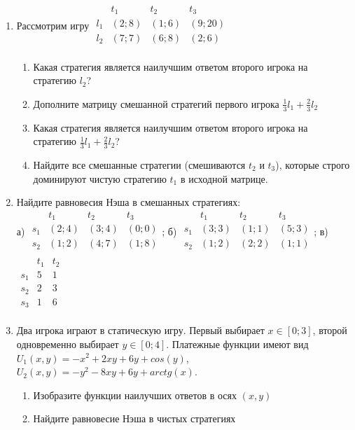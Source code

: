 \documentclass[pdftex,12pt,a4paper]{article}
\begin{document}
\begin{enumerate}

\item Рассмотрим игру $\begin{array}{c|ccc}
    {} &  {t_1 } & {t_2 } & {t_3 }   \\
\hline
    {l_1 } &  {\left( {2;8} \right)} & {\left( {1;6} \right)} & {\left( {9;20} \right)}   \\
    {l_2 } &  {\left( {7;7} \right)} & {\left( {6;8} \right)} & {\left( {2;6} \right)}   \\
\end{array}$
\begin{enumerate}
\item Какая стратегия является наилучшим ответом второго игрока на стратегию $l_2 $?
\item Дополните матрицу смешанной стратегий первого игрока $\frac{1}{3}l_1  + \frac{2}{3}l_2 $
\item Какая стратегия является наилучшим ответом второго игрока на стратегию $\frac{1}{3}l_1  + \frac{2}{3}l_2 $?
\item Найдите все смешанные стратегии (смешиваются $t_2 $  и $t_3 $), которые строго доминируют чистую стратегию $t_1 $ в исходной матрице. 
\end{enumerate}

\item Найдите равновесия Нэша в смешанных стратегиях: \\
а) $\begin{array}{c|ccc}
& t_{1} & t_{2} & t_{3} \\
\hline
s_{1} & (2;4) & (3;4) & (0;0) \\
s_{2} & (1;2) & (4;7) & (1;8) \\
\end{array}$;
б) $\begin{array}{c|ccc}
& t_{1} & t_{2} & t_{3} \\
\hline
s_{1} & (3;3) & (1;1) & (5;3) \\
s_{2} & (1;2) & (2;2) & (1;1) \\
\end{array}$;
в) $\begin{array}{c|cc}
& t_{1} & t_{2} \\
\hline
s_{1} & 5 & 1 \\
s_{2} & 2 & 3 \\
s_{3} & 1 & 6 \\
\end{array}$ 

\item Два игрока играют в статическую игру. Первый выбирает $x\in [0;3]$, второй одновременно выбирает $y\in [0;4]$. Платежные функции имеют вид $U_{1}(x,y)=-x^{2}+2xy+6y+cos(y)$, $U_{2}(x,y)=-y^{2}-8xy+6y+arctg(x)$. 
\begin{enumerate}
\item Изобразите функции наилучших ответов в осях $(x,y)$ 
\item Найдите равновесие Нэша в чистых стратегиях 
\end{enumerate}


\end{enumerate}
\end{document}
